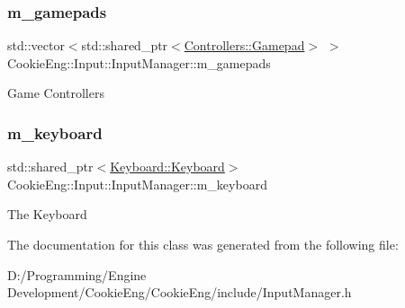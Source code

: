 \subsubsection{\texorpdfstring{m\+\_\+gamepads}{m\_gamepads}}
{\footnotesize\ttfamily std\+::vector$<$std\+::shared\+\_\+ptr$<$\hyperlink{class_cookie_eng_1_1_input_1_1_controllers_1_1_gamepad}{Controllers\+::\+Gamepad}$>$ $>$ Cookie\+Eng\+::\+Input\+::\+Input\+Manager\+::m\+\_\+gamepads\hspace{0.3cm}{\ttfamily [protected]}}

Game Controllers \mbox{\label{class_cookie_eng_1_1_input_1_1_input_manager_aa8137e98a8515c6da82cd3ca4f2f04bf}} 
\subsubsection{\texorpdfstring{m\+\_\+keyboard}{m\_keyboard}}
{\footnotesize\ttfamily std\+::shared\+\_\+ptr$<$\hyperlink{class_cookie_eng_1_1_input_1_1_keyboard_1_1_keyboard}{Keyboard\+::\+Keyboard}$>$ Cookie\+Eng\+::\+Input\+::\+Input\+Manager\+::m\+\_\+keyboard\hspace{0.3cm}{\ttfamily [protected]}}

The Keyboard 

The documentation for this class was generated from the following file\+:\begin{DoxyCompactItemize}
\item 
D\+:/\+Programming/\+Engine Development/\+Cookie\+Eng/\+Cookie\+Eng/include/Input\+Manager.\+h\end{DoxyCompactItemize}
